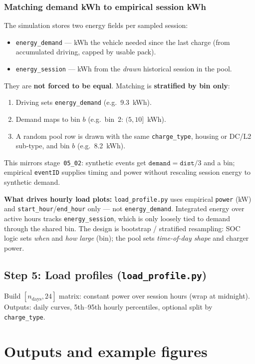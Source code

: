 \documentclass[11pt,a4paper]{article}
\begin{document}
\subsubsection{Matching demand kWh to empirical session kWh}
The simulation stores two energy fields per sampled session:
\begin{itemize}[noitemsep]
  \item \texttt{energy\_demand} --- kWh the vehicle needed since the last charge (from accumulated driving, capped by usable pack).
  \item \texttt{energy\_session} --- kWh from the \emph{drawn} historical session in the pool.
\end{itemize}
They are \textbf{not forced to be equal}. Matching is \textbf{stratified by bin only}:
\begin{enumerate}[noitemsep]
  \item Driving sets \texttt{energy\_demand} (e.g.\ 9.3~kWh).
  \item Demand maps to bin $b$ (e.g.\ bin~2: $(5,10]$~kWh).
  \item A random pool row is drawn with the same \texttt{charge\_type}, housing or DC/L2 sub-type, and bin $b$ (e.g.\ 8.2~kWh).
\end{enumerate}
This mirrors stage~\texttt{05\_02}: synthetic events get $\texttt{demand}=\texttt{dist}/3$ and a bin; empirical \texttt{eventID} supplies timing and power without rescaling session energy to synthetic demand.

\textbf{What drives hourly load plots:} \texttt{load\_profile.py} uses empirical \texttt{power} (kW) and \texttt{start\_hour}/\texttt{end\_hour} only --- not \texttt{energy\_demand}. Integrated energy over active hours tracks \texttt{energy\_session}, which is only loosely tied to demand through the shared bin. The design is bootstrap / stratified resampling: SOC logic sets \emph{when} and \emph{how large} (bin); the pool sets \emph{time-of-day shape} and charger power.

\subsection{Step 5: Load profiles (\texttt{load\_profile.py})}
Build $[n_{\text{days}}, 24]$ matrix: constant power over session hours (wrap at midnight). Outputs: daily curves, 5th--95th hourly percentiles, optional split by \texttt{charge\_type}.

\section{Outputs and example figures}
\end{document}
